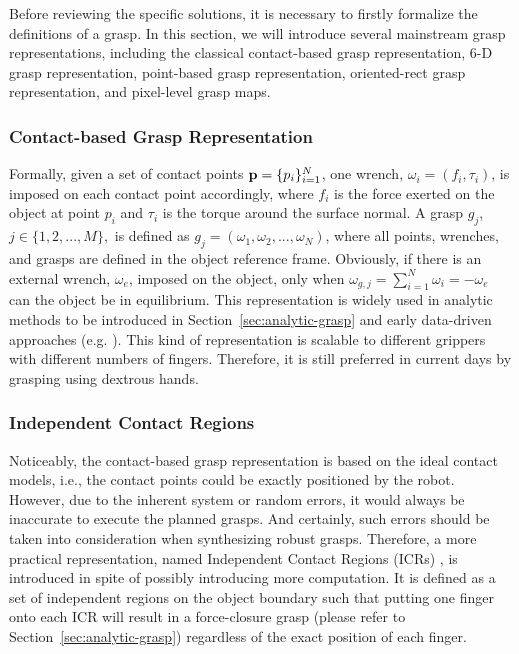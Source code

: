 \documentclass[letterpaper,10pt]{article}
\newcommand{\secref}[1]{Section~\ref{#1}}
\newcommand{\figref}[1]{Fig.~\ref{#1}}
\newcommand{\g}[1]{g_{#1}}
\newcommand{\gnum}{M}
\newcommand{\w}[1]{\omega_{#1}}
\newcommand{\wg}[1]{\omega_{g,#1}}
\newcommand{\we}{\omega_e}
\newcommand{\p}[1]{p_{#1}}
\newcommand{\pset}{{\bf p}}
\newcommand{\pnum}{N}
\begin{document}
Before reviewing the specific solutions, it is necessary to firstly formalize the definitions of a grasp.
In this section, we will introduce several mainstream grasp representations, including the classical contact-based grasp representation, 6-D grasp representation, point-based grasp representation, oriented-rect grasp representation, and pixel-level grasp maps.

\subsubsection{Contact-based Grasp Representation}
\label{sec:contact-grasp}

Formally, given a set of contact points $\pset=\{\p{i}\}_{i=1}^{\pnum}$, one wrench, $\w{i}=(f_i,\tau_i)$, is imposed on each contact point accordingly, where $f_i$ is the force exerted on the object at point $\p{i}$ and $\tau_i$ is the torque around the surface normal. A grasp $\g{j}$, $j\in\{1,2,...,\gnum\},$ is defined as $\g{j}=(\w{1}, \w{2}, ..., \w{\pnum})$, where all points, wrenches, and grasps are defined in the object reference frame. Obviously, if there is an external wrench, $\we$, imposed on the object, only when $\wg{j}=\sum_{i=1}^{\pnum}\w{i}=-\we$ can the object be in equilibrium.
This representation is widely used in analytic methods to be introduced in \secref{sec:analytic-grasp} and early data-driven approaches (e.g. \cite{kang1993toward, ekvall2005grasp, aleotti2006grasp}).
This kind of representation is scalable to different grippers with different numbers of fingers.
Therefore, it is still preferred in current days by grasping using dextrous hands.

\subsubsection{Independent Contact Regions}
\label{sec:icr-grasp}

Noticeably, the contact-based grasp representation is based on the ideal contact models, i.e., the contact points could be exactly positioned by the robot.
However, due to the inherent system or random errors, it would always be inaccurate to execute the planned grasps.
And certainly, such errors should be taken into consideration when synthesizing robust grasps.
Therefore, a more practical representation, named Independent Contact Regions (ICRs) \cite{nguyen1988constructing}, is introduced in spite of possibly introducing more computation.
It is defined as a set of independent regions on the object boundary such that putting one finger onto each ICR will result in a force-closure grasp (please refer to \secref{sec:analytic-grasp}) regardless of the exact position of each finger.
\end{document}
